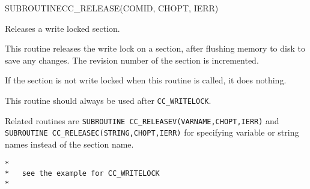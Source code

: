 \begin{routine} %
\subroutine
   {SUBROUTINE}{CC\_RELEASE}{(COMID, CHOPT, IERR)}
\begin{overview}
Releases a write locked section.
\end{overview}
\begin{argdeflist}
\end{argdeflist}
\begin{describe}
This routine releases the write lock on a section, after flushing
memory to disk to save any changes. The revision number of the
section is incremented.

If the section is not write locked when this routine is called, it
does nothing.

This routine should always be used after \verb!CC_WRITELOCK!.

Related routines are \verb|SUBROUTINE CC_RELEASEV(VARNAME,CHOPT,IERR)|
and \verb|SUBROUTINE CC_RELEASEC(STRING,CHOPT,IERR)| for specifying
variable or string names instead of the section name.

\end{describe}
\begin{options}
\end{options}
\begin{returncodes}
\end{returncodes}
\begin{examplecode}\begin{verbatim}
*
*   see the example for CC_WRITELOCK
*
\end{verbatim}\end{examplecode}
\end{routine}


